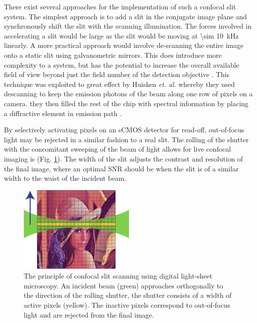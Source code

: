 There exist several approaches for the implementation of such a confocal slit system.
The simplest approach is to add a slit in the conjugate image plane and synchronously shift the slit with the scanning illumination.
The forces involved in accelerating a slit would be large as the slit would be moving at \SI{\sim 10}{\kilo\hertz} linearly.
A more practical approach would involve de-scanning the entire image onto a static slit using galvanometric mirrors.
This does introduce more complexity to a system, but has the potential to increase the overall available field of view beyond just the field number of the detection objective \cite{Huisken}.
This technique was exploited to great effect by Huisken \emph{et. al.} whereby they used descanning to keep the emission photons of the beam along one row of pixels on a camera.
they then filled the rest of the chip with spectral information by placing a diffractive element in emission path \cite{}.

By selectively activating pixels on an sCMOS detector for read-off, out-of-focus light may be rejected in a similar fashion to a real slit.
The rolling of the shutter with the concomitant sweeping of the beam of light allows for live confocal imaging is (Fig. \ref{fig:slit_scanning_alt}).
The width of the slit adjusts the contrast and resolution of the final image, where an optimal SNR should be when the slit is of a similar width to the waist of the incident beam.

\begin{figure}
  \centering
  \includegraphics{slit_scanning_alt}
  \caption{The principle of confocal slit scanning using digital light-sheet microscopy.
  An incident beam (green) approaches orthogonally to the direction of the rolling shutter, the shutter consists of a width of active pixels (yellow).
  The inactive pixels correspond to out-of-focus light and are rejected from the final image.}
  \label{fig:slit_scanning_alt}
\end{figure}

